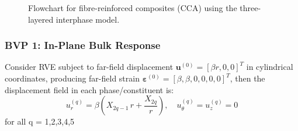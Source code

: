 \documentclass[oneside, 12pt, a4paper, bibliography=totoc]{book}
\newcommand{\bs}[1]{\bm{#1}}                       %
\begin{document}
\begin{figure}[htbp]
{%
}%
\caption{Flowchart for fibre-reinforced composites (CCA) using the three-layered interphase model.}
\label{fig:flowchart_interphase_cca}
\end{figure}

\subsubsection{BVP 1: In-Plane Bulk Response}

Consider RVE subject to far-field displacement $\bs{u}^{(0)} = [\beta r, 0, 0]^T$ in cylindrical coordinates, producing far-field strain $\bs{\varepsilon}^{(0)} = [\beta, \beta, 0, 0, 0, 0]^T$, then the displacement field in each phase/constituent is:
%
\begin{equation}
    u_r^{(q)} = \beta\left(X_{2q-1} \, r + \frac{X_{2q}}{r}\right), \quad u_\theta^{(q)} = u_z^{(q)} = 0
    \label{eq:ur_bulk_fiber}
\end{equation}
%
for all q = 1,2,3,4,5 \\
\end{document}
